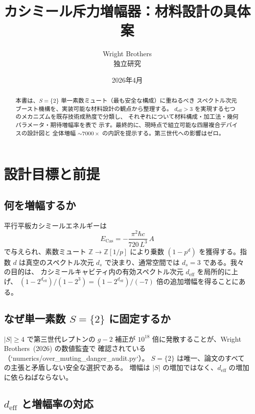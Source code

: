 \documentclass[11pt,a4paper]{article}
\title{カシミール斥力増幅器：材料設計の具体案}
\author{Wright Brothers\\{\small 独立研究}}
\date{2026年4月}
\newcommand{\deff}{d_{\mathrm{eff}}}
\begin{document}
\maketitle

\begin{abstract}
本書は、$S=\{2\}$ 単一素数ミュート（最も安全な構成）に重ねるべき
スペクトル次元ブースト機構を、実装可能な材料設計の観点から整理する。
$\deff > 3$ を実現する七つのメカニズムを既存技術成熟度で分類し、
それぞれについて材料構成・加工法・幾何パラメータ・期待増幅率を表で
示す。最終的に、現時点で組立可能な四層複合デバイスの設計図と
全体増幅 $\sim 7000\times$ の内訳を提示する。第三世代への影響はゼロ。
\end{abstract}

\section{設計目標と前提}

\subsection{何を増幅するか}

平行平板カシミールエネルギーは
\[
E_{\mathrm{Cas}} = -\frac{\pi^2 \hbar c}{720\,L^3}\, A
\]
で与えられ、素数ミュート $\mathbb{Z}\to\mathbb{Z}[1/p]$ により乗数
$(1-p^d)$ を獲得する。指数 $d$ は真空のスペクトル次元
$d_s$ で決まり、通常空間では $d_s = 3$ である。我々の目的は、
カシミールキャビティ内の有効スペクトル次元 $\deff$ を局所的に上げ、
$(1-2^{\deff})/(1-2^3) = (1-2^{\deff})/(-7)$ 倍の追加増幅を得ることにある。

\subsection{なぜ単一素数 $S=\{2\}$ に固定するか}

$|S|\geq 4$ で第三世代レプトンの $g-2$ 補正が
$10^{18}$ 倍に発散することが、Wright Brothers~(2026) の数値監査で
確認されている（`numerics/over\_muting\_danger\_audit.py`）。
$S=\{2\}$ は唯一、論文のすべての主張と矛盾しない安全な選択である。
増幅は $|S|$ の増加ではなく、$\deff$ の増加に依らねばならない。

\subsection{$\deff$ と増幅率の対応}
\end{document}
